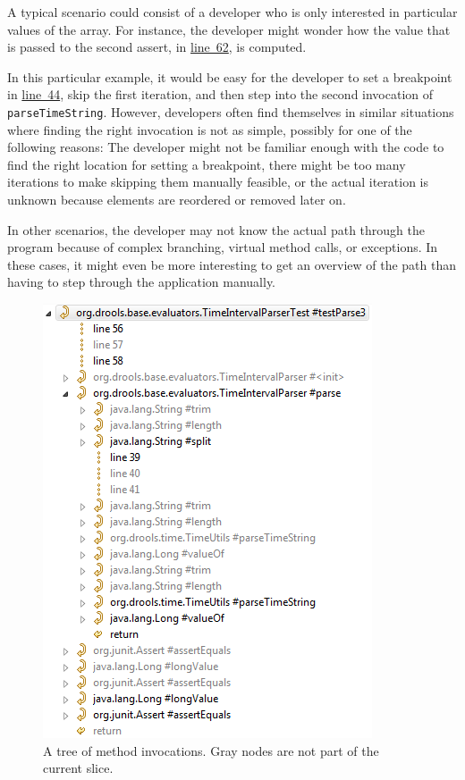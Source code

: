 \documentclass[english]{scrartcl}
\newcommand{\linerefn}[2]{\hyperref[#1]{line~#2}}
\begin{document}
A typical scenario could consist of a developer who is only interested in particular values of the array.
For instance, the developer might wonder how the value that is passed to the second assert, in \linerefn{lst:test}{62}, is computed.

In this particular example, it would be easy for the developer to set a breakpoint in \linerefn{lst:test}{44}, skip the first iteration, and then step into the second invocation of \verb+parseTimeString+.
However, developers often find themselves in similar situations where finding the right invocation is not as simple, possibly for one of the following reasons:
The developer might not be familiar enough with the code to find the right location for setting a breakpoint, there might be too many iterations to make skipping them manually feasible, or the actual iteration is unknown because elements are reordered or removed later on.

In other scenarios, the developer may not know the actual path through the program because of complex branching, virtual method calls, or exceptions.
In these cases, it might even be more interesting to get an overview of the path than having to step through the application manually.

\begin{figure}
\centering
\includegraphics[width=.75\linewidth]{img/calltree}
\caption{A tree of method invocations. Gray nodes are not part of the current slice.}
\label{fig:calltree}
\end{figure}
\end{document}
